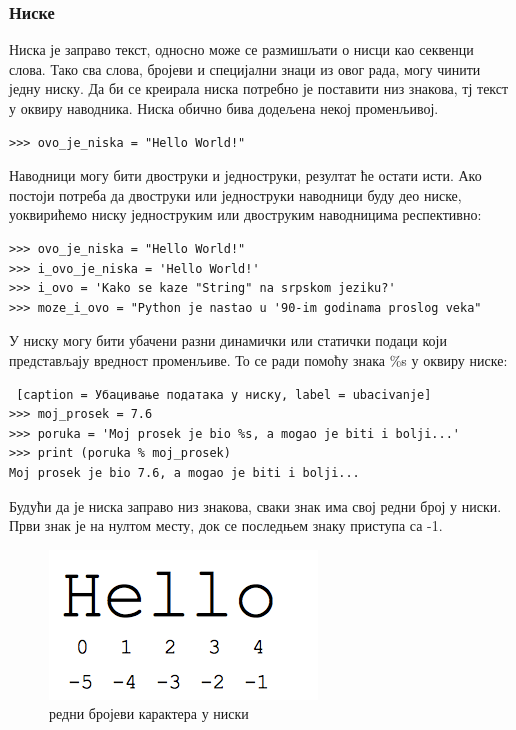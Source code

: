 \documentclass[11pt, serbianc, english, titlepage]{article}
\begin{document}
		\subsubsection{Ниске}
		Ниска је заправо текст, односно може се размишљати о нисци као секвенци слова. Тако сва слова, бројеви и специјални знаци из овог рада, могу чинити једну ниску. Да би се креирала ниска потребно је поставити низ знакова, тј текст у оквиру наводника. Ниска обично бива додељена некој променљивој.
		\begin{lstlisting}[caption = Креирање ниске, label = kreiranje_stringa]
>>> ovo_je_niska = "Hello World!"
		\end{lstlisting}
		\pagebreak
		Наводници могу бити двоструки и једноструки, резултат ће остати исти. Ако постоји потреба да двоструки или једноструки наводници буду део ниске, уоквирићемо ниску једноструким или двоструким наводницима респективно:
\begin{lstlisting}[caption = Примери креирања ниски, label = navodnici]
>>> ovo_je_niska = "Hello World!"
>>> i_ovo_je_niska = 'Hello World!'
>>> i_ovo = 'Kako se kaze "String" na srpskom jeziku?'
>>> moze_i_ovo = "Python je nastao u '90-im godinama proslog veka"
\end{lstlisting}
		У ниску могу бити убачени разни динамички или статички подаци који представљају вредност променљиве. То се ради помоћу знака \%s у оквиру ниске:
		\begin{lstlisting} [caption = Убацивање података у ниску, label = ubacivanje]
>>> moj_prosek = 7.6
>>> poruka = 'Moj prosek je bio %s, a mogao je biti i bolji...'
>>> print (poruka % moj_prosek)
Moj prosek je bio 7.6, a mogao je biti i bolji...		
		\end{lstlisting}
		Будући да је ниска заправо низ знакова, сваки знак има свој редни број у ниски. Први знак је на нултом месту, док се последњем знаку приступа са -1.\\
		\begin{figure}[hеre]
		\centering
		\includegraphics{hello_string.png}
		\caption{редни бројеви карактера у ниски}
		\label{slike:hello}
		\end{figure}
\end{document}
